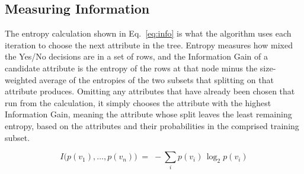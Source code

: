 \documentclass[conference]{IEEEtran}
\begin{document}
\subsection*{Measuring Information}
    The entropy calculation shown in Eq.~\eqref{eq:info} is what the algorithm uses each iteration to choose the next attribute in the tree. Entropy measures how mixed the Yes/No decisions are in a set of rows, and the Information Gain of a candidate attribute is the entropy of the rows at that node minus the size-weighted average of the entropies of the two subsets that splitting on that attribute produces. Omitting any attributes that have already been chosen that run from the calculation, it simply chooses the attribute with the highest Information Gain, meaning the attribute whose split leaves the least remaining entropy, based on the attributes and their probabilities in the comprised training subset.

\begin{equation}
    I\big(p(v_1),\dots,p(v_n)\big) \;=\; -\sum_{i} p(v_i)\,\log_2 p(v_i)
    \label{eq:info}
\end{equation}
\end{document}
